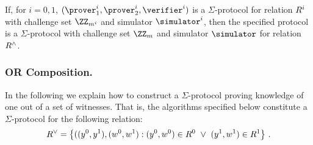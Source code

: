 \documentclass[runningheads]{llncs}
\begin{document}
\begin{theorem}
  If, for $i=0,1$, $(\prover_1^i,\prover_2^i,\verifier^i)$ is a $\Sigma$-protocol for relation $R^i$ with challenge set $\ZZ_{m^i}$ and simulator $\simulator^i$, then the specified protocol is a $\Sigma$-protocol with challenge set $\ZZ_m$ and simulator $\simulator$ for relation $R^\land$.
\end{theorem}


\subsubsection{OR Composition.}
  In the following we explain how to construct a $\Sigma$-protocol proving knowledge of one out of a set of witnesses.
  That is, the algorithms specified below constitute a $\Sigma$-protocol for the following relation:
$$
  R^\lor = \left\{ ((y^0,y^1),(w^0,w^1) : (y^0,w^0)\in R^0 ~\lor~ (y^1,w^1)\in R^1\right\}\,.
$$
\end{document}
